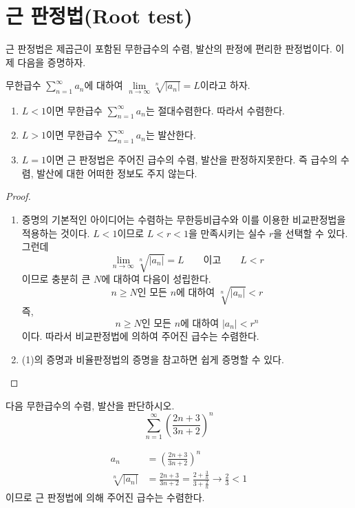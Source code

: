 \documentclass[11pt, a4paper]{book}
\begin{document}
\section{근 판정법(Root test)}
 근 판정법은 제곱근이 포함된 무한급수의 수렴, 발산의 판정에 편리한 판정법이다. 이제 다음을 증명하자.
 \begin{theorem}[근 판정법]
 	 무한급수 $\displaystyle \sum_{n=1}^{\infty}a_{n}$에 대하여 $\displaystyle \lim\limits_{n\to \infty}\sqrt[n]{\left|a_{n}\right|} =L$이라고 하자.
 	\begin{enumerate}[label=(\arabic*)]
 		\item $L<1$이면 무한급수 $\displaystyle \sum_{n=1}^{\infty}a_{n}$는 절대수렴한다. 따라서 수렴한다.
 		\item $L>1$이면 무한급수 $\displaystyle \sum_{n=1}^{\infty}a_{n}$는 발산한다.
 		\item $L=1$이면 근 판정법은 주어진 급수의 수렴, 발산을 판정하지못한다. 즉 급수의 수렴, 발산에 대한 어떠한 정보도 주지 않는다.
 	\end{enumerate}
 \end{theorem}
 \begin{proof}
 	\begin{enumerate}[label=(\arabic*)]
 		\item 증명의 기본적인 아이디어는 수렴하는 무한등비급수와 이를 이용한 비교판정법을 적용하는 것이다. $L<1$이므로 $L<r<1$을 만족시키는 실수 $r$을 선택할 수 있다. 그런데 
 		\begin{equation*}
 			\displaystyle \lim\limits_{n\to \infty}\sqrt[n]{\vert a_{n}\vert} =L \qquad \text{이고} \qquad L<r
 		\end{equation*}
 		이므로 충분히 큰 $N$에 대하여 다음이 성립한다.
 		\begin{equation*}
 			n \ge N \text{인 모든 }n \text{에 대하여 } \sqrt[n]{\vert a_{n}\vert} <r
 		\end{equation*}
 		즉,
 		\begin{equation*}
 			n \ge N \text{인 모든 }n \text{에 대하여 } \left|a_{n}\right| < r^{n}
 		\end{equation*}
 		이다. 따라서 비교판정법에 의하여 주어진 급수는 수렴한다.
 		\item (1)의 증명과 비율판정법의 증명을 참고하면 쉽게 증명할 수 있다.
 	\end{enumerate}
 \end{proof}
\vspace{1em}
\begin{example}
	다음 무한급수의 수렴, 발산을 판단하시오.
	\begin{equation*}
		\sum_{n=1}^{\infty}\left(\frac{2n+3}{3n+2}\right)^{n}
	\end{equation*}
\begin{solution}
	\begin{align*}
		a_{n} &=\left(\frac{2n+3}{3n+2}\right)^n \\
		\sqrt[n]{\vert a_{n}\vert} &= \frac{2n+3}{3n+2} = \frac{2+\frac{3}{n}}{3+\frac{2}{n}}  \to \frac{2}{3} <1
	\end{align*}
이므로 근 판정법에 의해 주어진 급수는 수렴한다.
\end{solution}
\end{example}
\vspace{1em}
\end{document}
